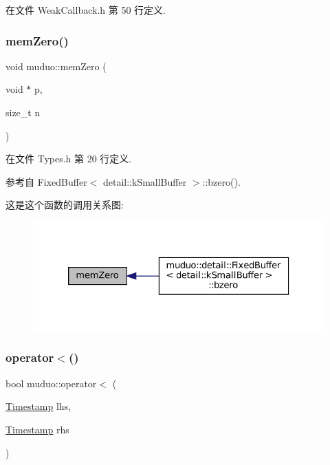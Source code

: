 在文件 Weak\+Callback.\+h 第 50 行定义.

\mbox{\label{namespacemuduo_a8f6d784bddb9d3e0774a665b147758bc}} 
\subsubsection{\texorpdfstring{mem\+Zero()}{memZero()}}
{\footnotesize\ttfamily void muduo\+::mem\+Zero (\begin{DoxyParamCaption}\item[{void $\ast$}]{p,  }\item[{size\+\_\+t}]{n }\end{DoxyParamCaption})\hspace{0.3cm}{\ttfamily [inline]}}



在文件 Types.\+h 第 20 行定义.



参考自 Fixed\+Buffer$<$ detail\+::k\+Small\+Buffer $>$\+::bzero().

这是这个函数的调用关系图\+:
\nopagebreak
\begin{figure}[H]
\begin{center}
\leavevmode
\includegraphics[width=326pt]{namespacemuduo_a8f6d784bddb9d3e0774a665b147758bc_icgraph}
\end{center}
\end{figure}
\mbox{\label{namespacemuduo_a7cdae651f87c159c785591256d06740e}} 
\subsubsection{\texorpdfstring{operator$<$()}{operator<()}\hspace{0.1cm}{\footnotesize\ttfamily [1/2]}}
{\footnotesize\ttfamily bool muduo\+::operator$<$ (\begin{DoxyParamCaption}\item[{\hyperlink{classmuduo_1_1Timestamp}{Timestamp}}]{lhs,  }\item[{\hyperlink{classmuduo_1_1Timestamp}{Timestamp}}]{rhs }\end{DoxyParamCaption})\hspace{0.3cm}{\ttfamily [inline]}}



